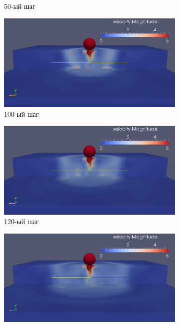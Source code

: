 \begin{figure}[H]
\begin{subfigure}[b]{0.5\textwidth}
\caption{50-ый шаг}
\end{subfigure}
\begin{subfigure}[b]{0.5\textwidth}
\centering
\includegraphics[width=1.0\textwidth]{png/delamination/velocity/100.png}
\caption{100-ый шаг}
\end{subfigure}
\begin{subfigure}[b]{0.5\textwidth}
\centering
\includegraphics[width=1.0\textwidth]{png/delamination/velocity/120.png}
\caption{120-ый шаг}
\end{subfigure}
\begin{subfigure}[b]{0.5\textwidth}
\centering
\includegraphics[width=1.0\textwidth]{png/delamination/velocity/150.png}

\end{subfigure}
\end{figure}
